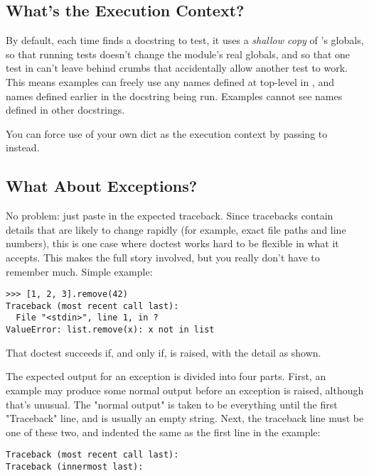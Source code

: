 \subsection{What's the Execution Context?}

By default, each time  finds a docstring to test, it
uses a \emph{shallow copy} of 's globals, so that running tests
doesn't change the module's real globals, and so that one test in
 can't leave behind crumbs that accidentally allow another test
to work.  This means examples can freely use any names defined at top-level
in , and names defined earlier in the docstring being run.
Examples cannot see names defined in other docstrings.

You can force use of your own dict as the execution context by passing
 to  instead.

\subsection{What About Exceptions?}

No problem:  just paste in the expected traceback.  Since
tracebacks contain details that are likely to change
rapidly (for example, exact file paths and line numbers), this is one
case where doctest works hard to be flexible in what it accepts.
This makes the full story involved, but you really don't have
to remember much.  Simple example:

\begin{verbatim}
>>> [1, 2, 3].remove(42)
Traceback (most recent call last):
  File "<stdin>", line 1, in ?
ValueError: list.remove(x): x not in list
\end{verbatim}

That doctest succeeds if, and only if,  is raised,
with the  detail as shown.

The expected output for an exception is divided into four parts.
First, an example may produce some normal output before an exception
is raised, although that's unusual.  The "normal output" is taken to
be everything until the first "Traceback" line, and is usually an
empty string.  Next, the traceback line must be one of these two, and
indented the same as the first line in the example:

\begin{verbatim}
Traceback (most recent call last):
Traceback (innermost last):
\end{verbatim}

